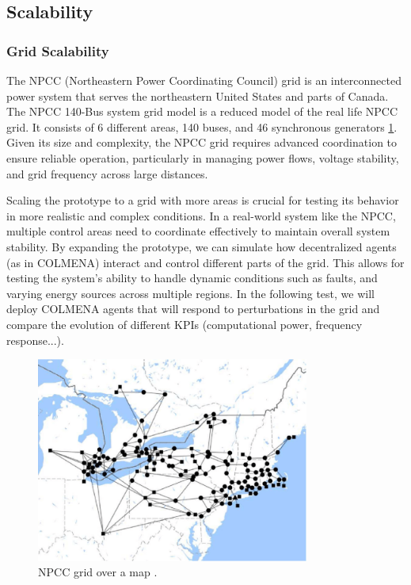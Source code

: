 \documentclass{article}
\begin{document}
\subsection{Scalability}

\subsubsection*{Grid Scalability}

The NPCC (Northeastern Power Coordinating Council) grid is an interconnected power system that serves the northeastern United States and parts of Canada. The NPCC 140-Bus system grid model\cite{grids:npcc} is a reduced model of the real life NPCC grid. It consists of 6 different areas, 140 buses, and 46 synchronous generators \ref{fig:npcc}. Given its size and complexity, the NPCC grid requires advanced coordination to ensure reliable operation, particularly in managing power flows, voltage stability, and grid frequency across large distances.

Scaling the prototype to a grid with more areas is crucial for testing its behavior in more realistic and complex conditions. In a real-world system like the NPCC, multiple control areas need to coordinate effectively to maintain overall system stability. By expanding the prototype, we can simulate how decentralized agents (as in COLMENA) interact and control different parts of the grid. This allows for testing the system's ability to handle dynamic conditions such as faults, and varying energy sources across multiple regions. In the following test, we will deploy COLMENA agents that will respond to perturbations in the grid and compare the evolution of different KPIs (computational power, frequency response...).

\begin{figure}[ht]
\centering
\includegraphics[width=0.8\textwidth]{figures/npcc_grid.png}  %
\caption{NPCC grid over a map \cite{grids:npcc}.}
\label{fig:npcc}
\end{figure}
\end{document}
